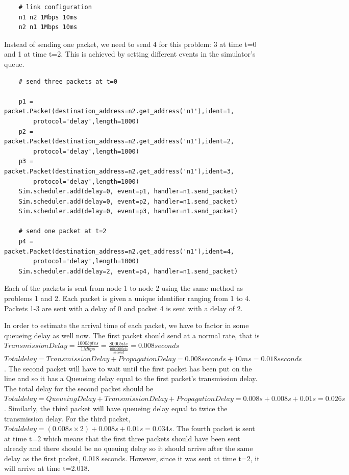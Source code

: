 \documentclass[11pt]{article}
\begin{document}
\begin{lstlisting}
    # link configuration
    n1 n2 1Mbps 10ms
    n2 n1 1Mbps 10ms
\end{lstlisting}

\vspace{5mm}

Instead of sending one packet, we need to send 4 for this problem: 3 at time t=0 and 1 at time t=2. This is achieved by setting different events in the simulator's queue.

\vspace{5mm}

\begin{lstlisting}
    # send three packets at t=0

    p1 = packet.Packet(destination_address=n2.get_address('n1'),ident=1,
        protocol='delay',length=1000)
    p2 = packet.Packet(destination_address=n2.get_address('n1'),ident=2,
        protocol='delay',length=1000)
    p3 = packet.Packet(destination_address=n2.get_address('n1'),ident=3,
        protocol='delay',length=1000)
    Sim.scheduler.add(delay=0, event=p1, handler=n1.send_packet)
    Sim.scheduler.add(delay=0, event=p2, handler=n1.send_packet)
    Sim.scheduler.add(delay=0, event=p3, handler=n1.send_packet)
    
    # send one packet at t=2
    p4 = packet.Packet(destination_address=n2.get_address('n1'),ident=4,
        protocol='delay',length=1000)
    Sim.scheduler.add(delay=2, event=p4, handler=n1.send_packet)
\end{lstlisting}

\vspace{5mm}

Each of the packets is sent from node 1 to node 2 using the same method as problems 1 and 2. Each packet is given a unique identifier ranging from 1 to 4. Packets 1-3 are sent with a delay of 0 and packet 4 is sent with a delay of 2. \par

In order to estimate the arrival time of each packet, we have to factor in some queueing delay as well now. The first packet should send at a normal rate, that is \(Transmission Delay = \frac{1000bytes}{1Mbps} = \frac{8000bits}{\frac{1000000bits}{second}} = 0.008 seconds\) \(Total delay = Transmission Delay + Propagation Delay = 0.008 seconds + 10 ms = 0.018 seconds\). The second packet will have to wait until the first packet has been put on the line and so it has a Queueing delay equal to the first packet's transmission delay. The total delay for the second packet should be \(Total delay = Queueing Delay + Transmission Delay + Propagation Delay = 0.008s + 0.008s + 0.01s = 0.026s\). Similarly, the third packet will have queueing delay equal to twice the transmission delay. For the third packet, \(Total delay = (0.008s \times 2) + 0.008s + 0.01s = 0.034s\). The fourth packet is sent at time t=2 which means that the first three packets should have been sent already and there should be no queuing delay so it should arrive after the same delay as the first packet, 0.018 seconds. However, since it was sent at time t=2, it will arrive at time t=2.018. \par
\end{document}
